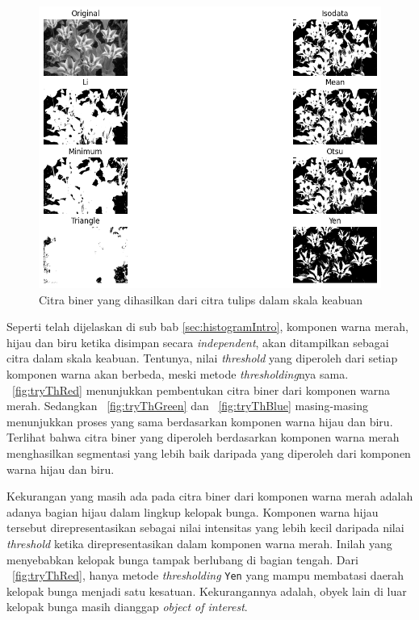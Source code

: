\begin{figure}
  \begin{center}
    \includegraphics[scale=.65]{pics/tryAllthTulipsGray.png}
    \caption{Citra biner yang dihasilkan dari citra tulips dalam skala keabuan}
    \label{fig:tulipsGray}
  \end{center}
\end{figure}

Seperti telah dijelaskan di sub bab \ref{sec:histogramIntro}, komponen warna merah, hijau dan biru ketika disimpan secara \textit{independent}, akan ditampilkan sebagai citra dalam skala keabuan. Tentunya, nilai \textit{threshold} yang diperoleh dari setiap komponen warna akan berbeda, meski metode \textit{thresholding}nya sama. \figurename~\ref{fig:tryThRed} menunjukkan pembentukan citra biner dari komponen warna merah. Sedangkan \figurename~\ref{fig:tryThGreen} dan \figurename~\ref{fig:tryThBlue} masing-masing menunjukkan proses yang sama berdasarkan komponen warna hijau dan biru. Terlihat bahwa citra biner yang diperoleh berdasarkan komponen warna merah menghasilkan segmentasi yang lebih baik daripada yang diperoleh dari komponen warna hijau dan biru. 

Kekurangan yang masih ada pada citra biner dari komponen warna merah adalah adanya bagian hijau dalam lingkup kelopak bunga. Komponen warna hijau tersebut direpresentasikan sebagai nilai intensitas yang lebih kecil daripada nilai \textit{threshold} ketika direpresentasikan dalam komponen warna merah. Inilah yang menyebabkan kelopak bunga tampak berlubang di bagian tengah. Dari \figurename~\ref{fig:tryThRed}, hanya metode \textit{thresholding} \texttt{Yen} yang mampu membatasi daerah kelopak bunga menjadi satu kesatuan. Kekurangannya adalah, obyek lain di luar kelopak bunga masih dianggap \textit{object of interest}.

